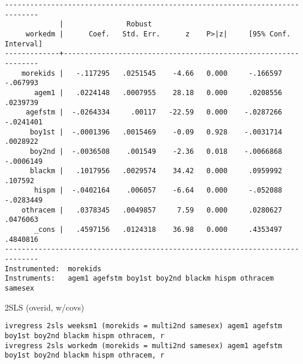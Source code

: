 \documentclass[cache=false]{article}
\begin{document}
\begin{verbatim}
------------------------------------------------------------------------------
             |               Robust
     workedm |      Coef.   Std. Err.      z    P>|z|     [95% Conf. Interval]
-------------+----------------------------------------------------------------
    morekids |   -.117295   .0251545    -4.66   0.000     -.166597    -.067993
       agem1 |   .0224148   .0007955    28.18   0.000     .0208556    .0239739
     agefstm |  -.0264334     .00117   -22.59   0.000    -.0287266   -.0241401
      boy1st |  -.0001396   .0015469    -0.09   0.928    -.0031714    .0028922
      boy2nd |  -.0036508    .001549    -2.36   0.018    -.0066868   -.0006149
      blackm |   .1017956   .0029574    34.42   0.000     .0959992     .107592
       hispm |  -.0402164    .006057    -6.64   0.000     -.052088   -.0283449
    othracem |   .0378345   .0049857     7.59   0.000     .0280627    .0476063
       _cons |   .4597156   .0124318    36.98   0.000     .4353497    .4840816
------------------------------------------------------------------------------
Instrumented:  morekids
Instruments:   agem1 agefstm boy1st boy2nd blackm hispm othracem samesex
\end{verbatim}

2SLS (overid, w/covs)
\begin{verbatim}
ivregress 2sls weeksm1 (morekids = multi2nd samesex) agem1 agefstm boy1st boy2nd blackm hispm othracem, r
ivregress 2sls workedm (morekids = multi2nd samesex) agem1 agefstm boy1st boy2nd blackm hispm othracem, r
\end{verbatim}
\end{document}
